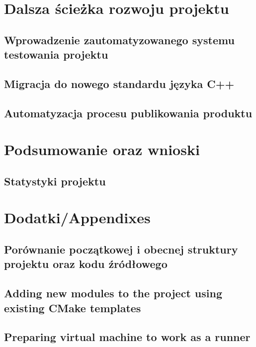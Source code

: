 \chapter{Dalsza ścieżka rozwoju projektu}
\label{cha:dalsze}

\section{Wprowadzenie zautomatyzowanego systemu testowania projektu}
\section{Migracja do nowego standardu języka C++}
\section{Automatyzacja procesu publikowania produktu}


\chapter{Podsumowanie oraz wnioski}
\label{cha:summary}

\section{Statystyki projektu}
\label{sec:stat}

\appendix
\chapter{Dodatki/Appendixes}
\label{cha:app}

\section{Porównanie początkowej i obecnej struktury projektu oraz kodu źródłowego}
\section{Adding new modules to the project using existing CMake templates}
\section{Preparing virtual machine to work as a runner}